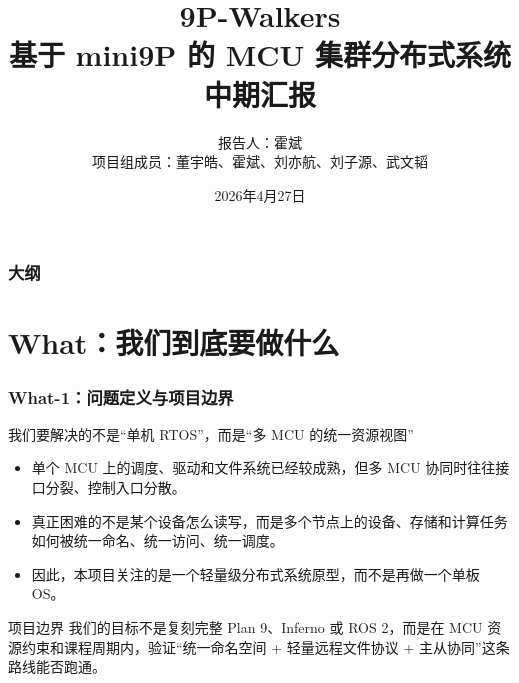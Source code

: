 \documentclass[aspectratio=169]{ctexbeamer}
\title[9P-Walkers 中期汇报]{
  9P-Walkers\\
  基于 mini9P 的 MCU 集群分布式系统\\
  中期汇报
}
\author[9P-Walkers]{
  报告人：霍斌\\
  项目组成员：董宇皓、霍斌、刘亦航、刘子源、武文韬
}
\institute[USTC]{
  中国科学技术大学\\
  OSH-2026 课程项目
}
\date{2026年4月27日}
\begin{document}
\maketitleframe

\begin{frame}
  \frametitle{大纲}
  \tableofcontents[hideallsubsections]
\end{frame}


\section{What：我们到底要做什么}

\begin{frame}
  \frametitle{What-1：问题定义与项目边界}
  \begin{block}{我们要解决的不是“单机 RTOS”，而是“多 MCU 的统一资源视图”}
    \small
    \begin{itemize}
      \item 单个 MCU 上的调度、驱动和文件系统已经较成熟，但多 MCU 协同时往往接口分裂、控制入口分散。
      \item 真正困难的不是某个设备怎么读写，而是\alert{多个节点上的设备、存储和计算任务如何被统一命名、统一访问、统一调度}。
      \item 因此，本项目关注的是一个\alert{轻量级分布式系统原型}，而不是再做一个单板 OS。
    \end{itemize}
  \end{block}
  \pause
  \begin{alertblock}{项目边界}
    \small
    我们的目标不是复刻完整 Plan 9、Inferno 或 ROS 2，而是在 MCU 资源约束和课程周期内，验证“\alert{统一命名空间 + 轻量远程文件协议 + 主从协同}”这条路线能否跑通。
  \end{alertblock}
\end{frame}
\end{document}
